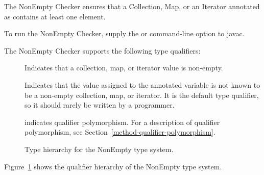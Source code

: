 \htmlhr
{}

The NonEmpty Checker ensures that a Collection, Map, or an Iterator annotated as
 contains at least one element.

To run the NonEmpty Checker, supply the
or 
command-line option to javac.

The NonEmpty Checker supports the following type qualifiers:
\begin{description}

    \item[]
    Indicates that a collection, map, or iterator value is non-empty.

    \item[]
    Indicates that the value assigned to the annotated variable is not known to be a non-empty
    collection, map, or iterator. It is the default type
    qualifier, so it should rarely be written by a programmer.

    \item[]
    indicates qualifier polymorphism.
    For a description of qualifier polymorphism, see
    Section~\ref{method-qualifier-polymorphism}.

\end{description}

\begin{figure}
    \caption{Type hierarchy for the NonEmpty type system.}
    \label{fig-nonempty-hierarchy}
\end{figure}

Figure~\ref{fig-nonempty-hierarchy} shows the qualifier hierarchy of the NonEmpty type system.
